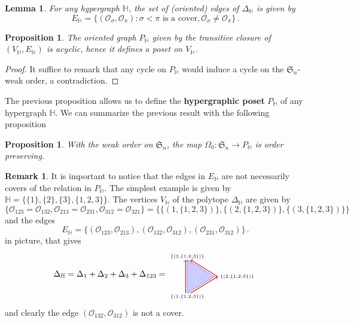 \documentclass[reqno]{amsart}
\newtheorem{proposition}[theorem]{Proposition}
\newtheorem{lemma}[theorem]{Lemma}
\theoremstyle{definition}
\newtheorem{remark}[theorem]{Remark}
\newcommand{\defn}[1]{\textbf{\textsf{\color{PineGreen} #1}}} %
\newcommand{\fS}{\mathfrak{S}} %
\newcommand{\Or}{\mathcal O}  %
\newcommand{\HH}{\mathbb H}  %
\begin{document}
\begin{lemma}\label{lem:Hedges}
For any hypergraph $\HH$, the set of (oriented) edges of $\Delta_{\HH}$ is given by 
 $$E_{\HH}=\{(\Or_\sigma,\Or_\pi): \sigma<\pi \text{ is a cover}, \Or_\sigma\ne\Or_\pi\}\,.$$
\end{lemma}

\begin{proposition}\label{prop:PHisOrder}
The oriented graph $P_{\HH}$ given by the transitive closure of $(V_{\HH},E_{\HH})$ is acyclic, hence it defines a poset on $V_{\HH}$.
\end{proposition}

\begin{proof} It suffice to remark that any cycle on $P_{\HH}$ would induce a cycle on the $\fS_n$-weak order, a contradiction.
\end{proof}

The previous proposition allows us to define the \defn{hypergraphic poset} $P_{\HH}$ of any hypergraph $\HH$.  
We can summarize the previous result with the following proposition

\begin{proposition}\label{prop:WeakToP}
With the weak order on $\fS_n$, the map $\Omega_0 \colon \fS_n \to P_{\HH}$ is order preserving.
\end{proposition}



\begin{remark}\label{rem:EdgeNotCover}
It is important to notice that the edges in $E_{\HH}$ are not necessarily covers of the relation in $P_{\HH}$. The simplest example is given by $\HH=\big\{\{1\},\{2\},\{3\},\{1,2,3\}\big\}$.
The vertices $V_{\HH}$ of the polytope $\Delta_{\HH}$ are given by
	$$\Big\{ \Or_{123}=\Or_{132}, \Or_{213}=\Or_{231}, \Or_{312}=\Or_{321}\Big\}= \Big\{ \big\{(1,\{1,2,3\})\big\},\big\{(2,\{1,2,3\})\big\},\big\{(3,\{1,2,3\})\big\}\Big\}$$
and the edges
	$$ E_{\HH}=\big\{ (\Or_{123},\Or_{213}),(\Or_{132},\Or_{312}),(\Or_{231}, \Or_{312})\big\}\,.$$
in picture, that gives
$$\Delta_\HH=\Delta_1+\Delta_2+\Delta_3+\Delta_{123}=
\begin{tikzpicture}[scale=.7,baseline=.0cm]
	\node (a) at (0,-1.2) {$\scriptscriptstyle \{(1,\{1,2,3\})\}$};
	\node (b) at (3,0) {$\scriptscriptstyle \{(2,\{1,2,3\})\}$};
	\node (c) at (0,1.2) {$\scriptscriptstyle \{(3,\{1,2,3\})\}$};
	\draw [color=blue!40,thick,fill=blue!20] (0,-1)--(0,1)--(1.632,0)--(0,-1) ; 
	\draw [color=red,thick,->] (-.1,-1)--(-.1,1); 
	\draw [color=red,thick,->] (1.832,0)--(.2,1); 
	\draw [color=red,thick,->] (.2,-1)--(1.832,0); 
\end{tikzpicture}
$$
and clearly the edge $(\Or_{132},\Or_{312})$ is not a cover. 
\end{remark}
\end{document}
